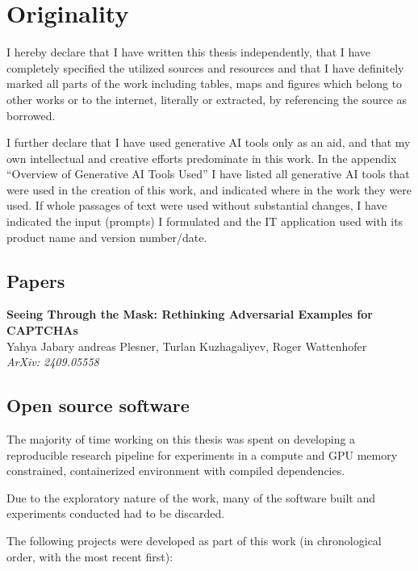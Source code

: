 \documentclass[a4paper, oneside]{discothesis}
\newcommand{\linebreaks}{\vspace*{0.5em}}
\begin{document}
\chapter*{Originality}


I hereby declare that I have written this thesis independently, that I have completely specified the utilized sources and resources and that I have definitely marked all parts of the work \textendash{} including tables, maps and figures \textendash{} which belong to other works or to the internet, literally or extracted, by referencing the source as borrowed.

I further declare that I have used generative AI tools only as an aid, and that my own intellectual and creative efforts predominate in this work. In the appendix ``Overview of Generative AI Tools Used'' I have listed all generative AI tools that were used in the creation of this work, and indicated where in the work they were used. If whole passages of text were used without substantial changes, I have indicated the input (prompts) I formulated and the IT application used with its product name and version number/date.

\section*{Papers}

\textbf{Seeing Through the Mask: Rethinking Adversarial Examples for CAPTCHAs} \\
Yahya Jabary andreas Plesner, Turlan Kuzhagaliyev, Roger Wattenhofer \\
\textit{ArXiv: 2409.05558}

\section*{Open source software}

The majority of time working on this thesis was spent on developing a reproducible research pipeline for experiments in a compute and GPU memory constrained, containerized environment with compiled dependencies.

Due to the exploratory nature of the work, many of the software built and experiments conducted had to be discarded.

The following projects were developed as part of this work (in chronological order, with the most recent first):

\linebreaks
\end{document}
